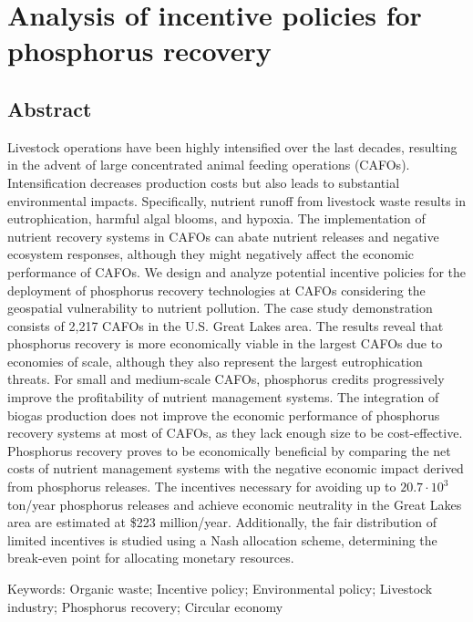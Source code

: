 \chapter{Analysis of incentive policies for phosphorus recovery}\label{ch:Policies}
\begin{refsection}[referencesCh5]
\section*{Abstract}
Livestock operations have been highly intensified over the last decades, resulting in the advent of large concentrated animal feeding operations (CAFOs). Intensification decreases production costs but also leads to substantial environmental impacts. Specifically, nutrient runoff from livestock waste results in eutrophication, harmful algal blooms, and hypoxia. The implementation of nutrient recovery systems in CAFOs can abate nutrient releases and negative ecosystem responses, although they might negatively affect the economic performance of CAFOs. We design and analyze potential incentive policies for the deployment of phosphorus recovery technologies at CAFOs considering the geospatial vulnerability to nutrient pollution. The case study demonstration consists of 2,217 CAFOs in the U.S. Great Lakes area. The results reveal that phosphorus recovery is more economically viable in the largest CAFOs due to economies of scale, although they also represent the largest eutrophication threats. For small and medium-scale CAFOs, phosphorus credits progressively improve the profitability of nutrient management systems. The integration of biogas production does not improve the economic performance of phosphorus recovery systems at most of CAFOs, as they lack enough size to be cost-effective. Phosphorus recovery proves to be economically beneficial by comparing the net costs of nutrient management systems with the negative economic impact derived from phosphorus releases. The incentives necessary for avoiding up to $20.7 \cdot 10^3$ ton/year phosphorus releases and achieve economic neutrality in the Great Lakes area are estimated at \$223 million/year. Additionally, the fair distribution of limited incentives is studied using a Nash allocation scheme, determining the break-even point for allocating monetary resources.

\bigskip
Keywords: Organic waste; Incentive policy; Environmental policy; Livestock industry; Phosphorus recovery; Circular economy
\newpage


\end{refsection}
